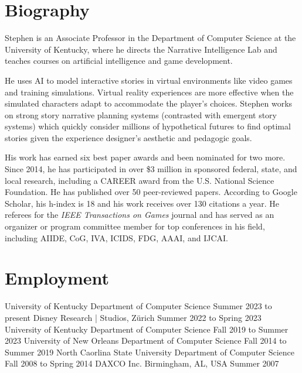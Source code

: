 \documentclass{cv}
\begin{document}
\maketitle


\section*{Biography}

Stephen is an Associate Professor in the Department of Computer Science at the
University of Kentucky, where he directs the Narrative Intelligence Lab and
teaches courses on artificial intelligence and game development.

He uses AI to model interactive stories in virtual environments like video
games and training simulations. Virtual reality experiences are more effective
when the simulated characters adapt to accommodate the player’s choices. Stephen
works on strong story narrative planning systems (contrasted with emergent
story systems) which quickly consider millions of hypothetical futures to find
optimal stories given the experience designer’s aesthetic and pedagogic goals.

His work has earned six best paper awards and been nominated for two more.
Since 2014, he has participated in over \$3 million in sponsored federal, state,
and local research, including a CAREER award from the U.S. National Science
Foundation. He has published over 50 peer-reviewed papers. According to Google
Scholar, his h-index is 18 and his work receives over 130 citations a year. He
referees for the {\em IEEE Transactions on Games} journal and has served as an
organizer or program committee member for top conferences in his field,
including AIIDE, CoG, IVA, ICIDS, FDG, AAAI, and IJCAI.


\section*{Employment}
	{University of Kentucky Department of Computer Science}
	{Summer 2023 to present}
	{Disney Research | Studios, Zürich}
	{Summer 2022 to Spring 2023}
	{University of Kentucky Department of Computer Science}
	{Fall 2019 to Summer 2023}
	{University of New Orleans Department of Computer Science}
	{Fall 2014 to Summer 2019}
	{North Caorlina State University Department of Computer Science}
	{Fall 2008 to Spring 2014}
	{DAXCO Inc. Birmingham, AL, USA}
	{Summer 2007}
\end{document}
